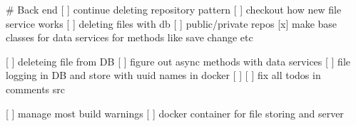 # Back end
[ ] continue deleting repository pattern
[ ] checkout how new file service works
[ ] deleting files with db
[ ] public/private repos
[x] make base classes for data services for methods like save change etc

[ ] deleteing file from DB
[ ] figure out async methods with data services
[ ] file logging in DB and store with uuid names in docker
[ ]
[ ] fix all todos in comments src

[ ] manage most build warnings
[ ] docker container for file storing and server
